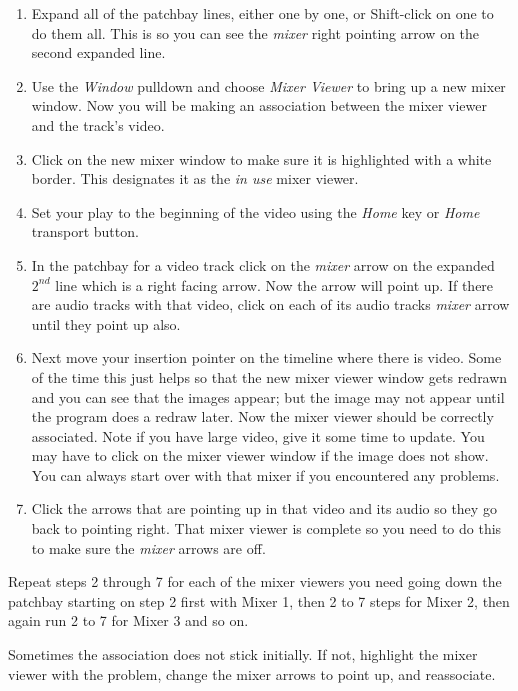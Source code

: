 \begin{enumerate}
	\item Expand all of the patchbay lines, either one by one, or Shift-click on one to do them all. This is so you can see the \textit{mixer} right pointing arrow on the second expanded line.    
	\item Use the \textit{Window} pulldown and choose \textit{Mixer Viewer} to bring up a new mixer window.  Now you will be making an association between the mixer viewer and the track’s video.
	\item Click on the new mixer window to make sure it is highlighted with a white border. This designates it as the \textit{in use} mixer viewer.
	\item Set your play to the beginning of the video using the \textit{Home} key or \textit{Home} transport button.
	\item In the patchbay for a video track click on the \textit{mixer} arrow on the expanded $2^{nd}$ line which is a right facing arrow.  Now the arrow will point up.  If there are audio tracks with that video, click on each of its audio tracks \textit{mixer} arrow until they point up also.
	\item Next move your insertion pointer on the timeline where there is video.  Some of the time this just helps so that the new mixer viewer window gets redrawn and you can see that the images appear; but the image may not appear until the program does a redraw later.  Now the mixer viewer should be
	correctly associated.  Note if you have large video, give it some time to update.  You may have to click on the mixer viewer window if the image does not show.  You can always start over with that mixer if you encountered any problems.
	\item Click the arrows that are pointing up in that video and its audio so they go back to pointing right. That mixer viewer is complete so you need to do this to make sure the \textit{mixer} arrows are off.
\end{enumerate}

Repeat steps 2 through 7 for each of the mixer viewers you need going down the patchbay starting on step 2 first with Mixer 1, then 2 to 7 steps for Mixer 2, then again run 2 to 7 for Mixer 3 and so on.

Sometimes the association does not stick initially.  If not, highlight the mixer viewer with the problem, change the mixer arrows to point up, and reassociate.

